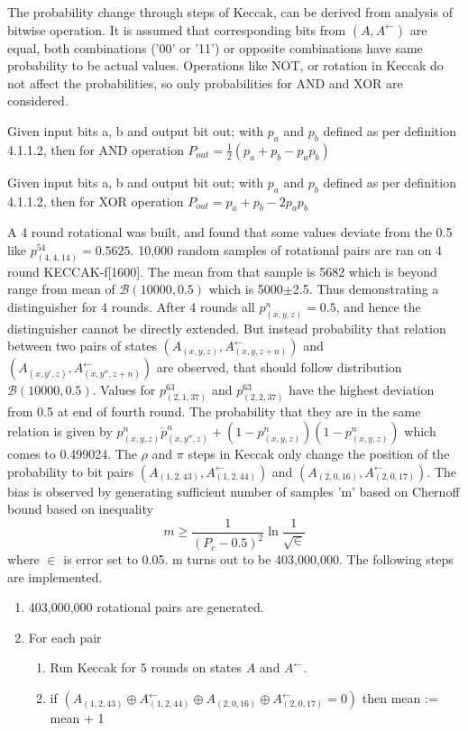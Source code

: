 The probability change through steps of Keccak, can be derived from analysis of bitwise operation. It is assumed
that corresponding bits from $(A, A^{\leftarrow})$ are equal, both combinations ('00' or '11') or opposite combinations
have same probability to be actual values. Operations like NOT, or rotation in Keccak do not affect the probabilities,
so only probabilities for AND and XOR are considered.

\begin{lem}
Given input bits a, b and output bit out; with $p_a$ and $p_b$ defined as per definition 4.1.1.2, then for AND operation
$P_{out} = \frac{1}{2}(p_{a} + p_{b} - p_{a} p_{b})$ \cite{00022}
\end{lem}

\begin{lem}
Given input bits a, b and output bit out; with $p_a$ and $p_b$ defined as per definition 4.1.1.2, then for XOR operation
$P_{out} = p_{a} + p_{b} - 2 p_{a} p_{b}$ \cite{00022}
\end{lem}

A 4 round rotational was built, and found that some values deviate from the 0.5 like $p^{54}_{(4, 4, 14)} = 0.5625$. 10,000
random samples of rotational pairs are ran on 4 round KECCAK-f[1600]. The mean from that sample is 5682 which is beyond
range from mean of $\mathcal{B}(10000, 0.5)$ which is 5000$\pm$2.5. Thus demonstrating a distinguisher for 4 rounds.
After 4 rounds all $p^n_{(x, y, z)} = 0.5$, and hence the distinguisher cannot be directly extended. But instead probability
that relation between two pairs of states $(A_{(x, y, z)}, A^{\leftarrow}_{(x, y, z+n)})$ and 
$(A_{(x, y', z)}, A^{\leftarrow}_{(x, y'', z+n)})$ are observed, that should follow distribution $\mathcal{B}(10000, 0.5)$.
Values for $p^{63}_{(2, 1, 37)}$ and $p^{63}_{(2, 2, 37)}$ have the highest deviation from 0.5 at end of fourth round. The
probability that they are in the same relation is given by $p^n_{(x, y, z)} \dot p^n_{(x, y'', z)} + (1 - p^n_{(x, y, z)})
(1 - p^n_{(x, y, z)})$ which comes to 0.499024. The $\rho$ and $\pi$ steps in Keccak only change the position of the
probability to bit pairs $(A_{(1, 2, 43)}, A^{\leftarrow}_{(1, 2, 44)})$ and $(A_{(2, 0, 16)}, A^{\leftarrow}_{(2, 0, 17)})$.
The bias is observed by generating sufficient number of samples 'm' based on Chernoff bound based on inequality 
\[ m \geq \frac{1}{(P_c - 0.5)^2} \ln \frac{1}{\sqrt \in}\]
where $\in$ is error set to 0.05. m turns out to be 403,000,000. The following steps are implemented.\cite{00022}
\begin{enumerate}
\item 403,000,000 rotational pairs are generated.
\item For each pair
  \begin{enumerate}
  \item Run Keccak for 5 rounds on states $A$ and $A^{\leftarrow}$.
  \item if $(A_{(1, 2, 43)} \oplus A^{\leftarrow}_{(1, 2, 44)} \oplus A_{(2, 0, 16)} \oplus A^{\leftarrow}_{(2, 0, 17)} = 0)$
  then \newline mean := mean + 1
  \end{enumerate}
\end{enumerate}

